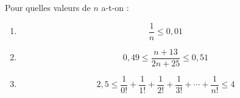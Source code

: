 Pour quelles valeurs de $n$ a-t-on :
\begin{enumerate}
  \item
  \[
  \frac{1}{n} \leq 0{,}01
  \]
  \item
  \[
  0{,}49 \leq \frac{n+13}{2n+25} \leq 0{,}51
  \]
  \item
  \[
  2{,}5 \leq \frac{1}{0!} + \frac{1}{1!} + \frac{1}{2!} + \frac{1}{3!} + \cdots + \frac{1}{n!} \leq 4
  \]
\end{enumerate}
